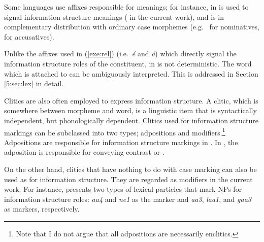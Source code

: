 \noindent Some languages use affixes responsible for  meanings;
for instance, \nun in  is used to signal information structure
meanings ( in the current work), and is in
complementary distribution with ordinary case morphemes (e.g.\ \ika
for nominatives, \lul for accusatives).






\noindent Unlike the  affixes used in (\ref{exe:rel})
(i.e.\ \textit{{\'e}} and \textit{{\'a}}) which directly signal the
information structure roles of the constituent, \nun in 
is not deterministic. The word which \nun is attached to can be
ambiguously interpreted. This is addressed in Section \ref{5:sec:lex} in
detail.




Clitics are also often employed to express information structure. A
clitic, which is somewhere between morpheme and word, is a linguistic
item that is syntactically independent, but phonologically dependent.
Clitics used for information structure markings can be subclassed into
two types; adpositions and modifiers.\footnote{Note that 
I do not argue that all adpositions are necessarily enclitics.} 
Adpositions are responsible for
information structure markings in . In
, the adposition \wa is responsible for conveying
contrast or .






\noindent On the other hand, clitics that have nothing to do with case
marking can also be used as  for information
structure. They are regarded as modifiers in the current work. For
instance, \citet{man:07} presents two types of  lexical
particles that mark NPs for information structure roles: \textit{aa4}
and \textit{ne1} as the  marker and \textit{aa3}, \textit{laa1},
and \textit{gaa3} as  markers, respectively.



